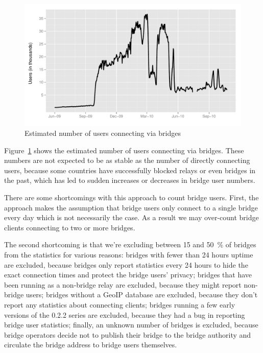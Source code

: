 \documentclass{article}
\begin{document}
\begin{figure}
\includegraphics[width=\textwidth]{bridge-users.pdf}
\caption{Estimated number of users connecting via bridges}
\label{fig:bridge-users}
\end{figure}

Figure~\ref{fig:bridge-users} shows the estimated number of users
connecting via bridges.
These numbers are not expected to be as stable as the number of directly
connecting users, because some countries have successfully blocked relays or
even bridges in the past, which has led to sudden increases or decreases in
bridge user numbers.

There are some shortcomings with this approach to count bridge users.
First, the approach makes the assumption that bridge users only connect to
a single bridge every day which is not necessarily the case.
As a result we may over-count bridge clients connecting to two or more
bridges.

The second shortcoming is that we're excluding between 15 and 50~\% of
bridges from the statistics for various reasons:
bridges with fewer than 24 hours uptime are excluded, because bridges only
report statistics every 24 hours to hide the exact connection times and
protect the bridge users' privacy;
bridges that have been running as a non-bridge relay are excluded, because
they might report non-bridge users;
bridges without a GeoIP database are excluded, because they don't report
any statistics about connecting clients;
bridges running a few early versions of the 0.2.2 series are excluded,
because they had a bug in reporting bridge user statistics;
finally, an unknown number of bridges is excluded, because bridge
operators decide not to publish their bridge to the bridge authority and
circulate the bridge address to bridge users themselves.
\end{document}
